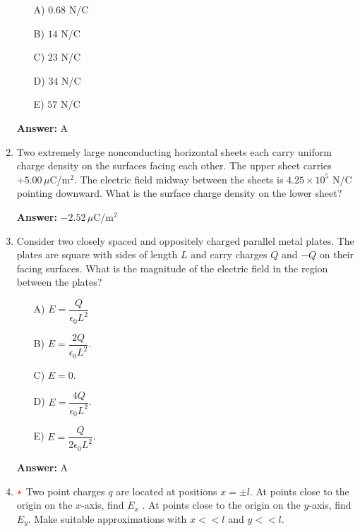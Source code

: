 \begin{enumerate}
    \begin{multicols}{5}
    \begin{itemize}
        \item[A)] $0.68$ N/C
        \item[B)] $14$ N/C
        \item[C)] $23$ N/C
        \item[D)] $34$ N/C
        \item[E)] $57$ N/C
    \end{itemize}
    \end{multicols}

    \textbf{Answer:} A

    \item Two extremely large nonconducting horizontal sheets each carry uniform charge density on the surfaces facing each other. The upper sheet carries $+5.00\,\mu$C/m$^2$. The electric field midway between the sheets is $4.25\times10^5$ N/C pointing downward. What is the surface charge density on the lower sheet?

    \textbf{Answer:} $-2.52\,\mu$C/m$^2$

    \item Consider two closely spaced and oppositely charged parallel metal plates. The plates are square with sides of length $L$ and carry charges $Q$ and $-Q$ on their facing surfaces. What is the magnitude of the electric field in the region between the plates?

\begin{multicols}{5}
    \begin{itemize}
        \item[A)] $E = \dfrac{Q}{\epsilon_0L^2}$
        \item[B)] $E = \dfrac{2Q}{\epsilon_0L^2}$.
        \item[C)] $E=0$.
        \item[D)] $E = \dfrac{4Q}{\epsilon_0L^2}$.
        \item[E)] $E = \dfrac{Q}{2\epsilon_0L^2}$.
    \end{itemize}
\end{multicols}

\textbf{Answer:} A

\item $\color{red}{\star}$ Two point charges $q$ are located at positions $x = \pm l$. At points
close to the origin on the $x$-axis, find $E_x$ . At points close to the
origin on the $y$-axis, find $E_y$. Make suitable approximations
with $x<<l$ and $y<<l$.


\end{enumerate}
